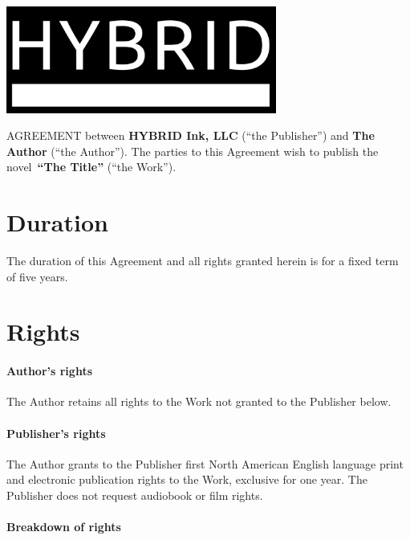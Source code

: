 \documentclass[12pt,letterpaper]{article}
\def\WorkTitle{The Title}
\def\WorkAuthor{The Author}
\def\WorkType{novel}
\begin{document}
\begin{center}
\noindent\includegraphics[width=3.5in]{logo}
\end{center}

\vspace{0.5in}

\noindent AGREEMENT between \textbf{HYBRID Ink, LLC} (``the Publisher'') and \textbf{\WorkAuthor} (``the Author''). The parties to this Agreement wish to publish the \WorkType\ \textbf{``\WorkTitle''} (``the Work'').

\section{Duration}

The duration of this Agreement and all rights granted herein is for a fixed term of five years.

\section{Rights}

\paragraph{Author's rights}

The Author retains all rights to the Work not granted to the Publisher below.

\paragraph{Publisher's rights}

The Author grants to the Publisher first North American English language print and electronic publication rights to the Work, exclusive for one year. The Publisher does not request audiobook or film rights.

\paragraph{Breakdown of rights}
\end{document}
